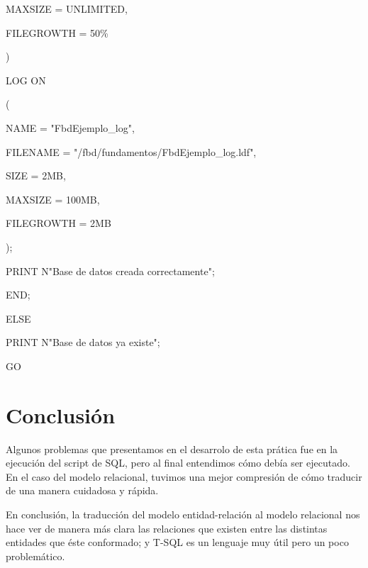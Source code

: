 \documentclass[12pt, letterpaper]{article}
\begin{document}
                MAXSIZE = UNLIMITED,\vspace{.1cm}

                FILEGROWTH = 50\%\vspace{.1cm}
        
            )\vspace{.1cm}

            LOG ON\vspace{.1cm}

            (\vspace{.1cm}

                NAME = "FbdEjemplo_log",\vspace{.1cm}

                FILENAME =  "/fbd/fundamentos/FbdEjemplo_log.ldf",\vspace{.1cm}

                SIZE = 2MB,\vspace{.1cm}

                MAXSIZE = 100MB,\vspace{.1cm}

                FILEGROWTH = 2MB\vspace{.1cm}

            );\vspace{.1cm}

            PRINT N"Base de datos creada correctamente"; \vspace{.1cm}

            END;\vspace{.1cm}

            ELSE\vspace{.1cm}

            PRINT N"Base de datos ya existe";\vspace{.1cm}

            GO\vspace{.1cm}

    \section*{Conclusión}
    Algunos problemas que presentamos en el desarrolo de esta prática fue en la ejecución del script de SQL, pero al
    final entendimos cómo debía ser ejecutado. En el caso del modelo relacional, tuvimos una mejor compresión de cómo
    traducir de una manera cuidadosa y rápida.\vspace{.3cm}
    
    En conclusión, la traducción del modelo entidad-relación al modelo relacional nos hace ver de manera más clara
    las relaciones que existen entre las distintas entidades que éste conformado; y T-SQL es un lenguaje muy útil 
    pero un poco problemático.
\end{document}
